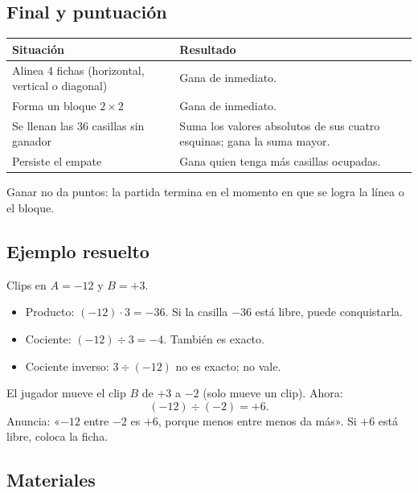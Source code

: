 \documentclass[12pt, letterpaper]{article}
\begin{document}
\subsection{Final y puntuación}

\begin{center}
\small
\begin{tabular}{@{}p{7.2cm} p{6.8cm}@{}}
\toprule
\textbf{Situación} & \textbf{Resultado}\\
\midrule
Alinea 4 fichas (horizontal, vertical o diagonal) & Gana de inmediato.\\
Forma un bloque $2\times 2$ & Gana de inmediato.\\
Se llenan las 36 casillas sin ganador & Suma los valores absolutos de sus cuatro esquinas; gana la suma mayor.\\
Persiste el empate & Gana quien tenga más casillas ocupadas.\\
\bottomrule
\end{tabular}
\end{center}

Ganar no da puntos: la partida termina en el momento en que se logra la línea o el bloque.

\subsection{Ejemplo resuelto}

Clips en $A=-12$ y $B=+3$.

\begin{itemize}[leftmargin=*]
  \item Producto: $(-12)\cdot 3=-36$. Si la casilla $-36$ está libre, puede conquistarla.
  \item Cociente: $(-12)\div 3=-4$. También es exacto.
  \item Cociente inverso: $3\div(-12)$ no es exacto; no vale.
\end{itemize}

El jugador mueve el clip $B$ de $+3$ a $-2$ (solo mueve un clip). Ahora:
\[
(-12)\div(-2)=+6.
\]
Anuncia: «$-12$ entre $-2$ es $+6$, porque menos entre menos da más». Si $+6$ está libre, coloca la ficha.

\subsection{Materiales}
\end{document}
